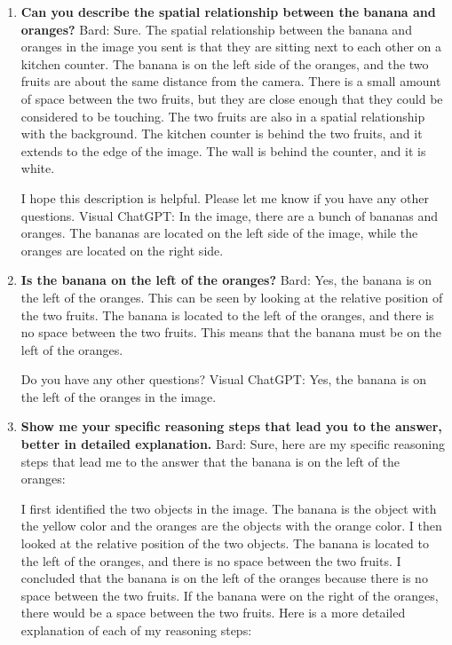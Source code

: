     \begin{enumerate}
        \item \textbf{Can you describe the spatial relationship between the banana and oranges?}
        \subitem 
        Bard: Sure. The spatial relationship between the banana and oranges in the image you sent is that they are sitting next to each other on a kitchen counter. The banana is on the left side of the oranges, and the two fruits are about the same distance from the camera. There is a small amount of space between the two fruits, but they are close enough that they could be considered to be touching.
        The two fruits are also in a spatial relationship with the background. The kitchen counter is behind the two fruits, and it extends to the edge of the image. The wall is behind the counter, and it is white.

        I hope this description is helpful. Please let me know if you have any other questions.
        \subitem Visual ChatGPT: In the image, there are a bunch of bananas and oranges. The bananas are located on the left side of the image, while the oranges are located on the right side.
        \item \textbf{Is the banana on the left of the oranges?}
        \subitem Bard:
        Yes, the banana is on the left of the oranges. This can be seen by looking at the relative position of the two fruits. The banana is located to the left of the oranges, and there is no space between the two fruits. This means that the banana must be on the left of the oranges.
        
        Do you have any other questions?
        \subitem Visual ChatGPT: Yes, the banana is on the left of the oranges in the image.
        \item \textbf{Show me your specific reasoning steps that lead you to the answer, better in detailed explanation.}
        \subitem Bard: Sure, here are my specific reasoning steps that lead me to the answer that the banana is on the left of the oranges:

        I first identified the two objects in the image. The banana is the object with the yellow color and the oranges are the objects with the orange color.
        I then looked at the relative position of the two objects. The banana is located to the left of the oranges, and there is no space between the two fruits.
        I concluded that the banana is on the left of the oranges because there is no space between the two fruits. If the banana were on the right of the oranges, there would be a space between the two fruits.
        Here is a more detailed explanation of each of my reasoning steps:
        

\end{enumerate}
